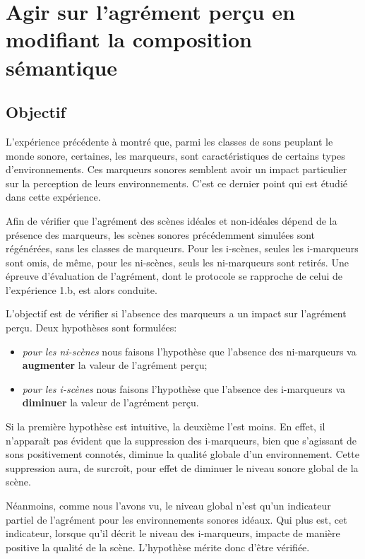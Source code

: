\section[Modification de la composition sémantique]{Agir sur l'agrément perçu en modifiant la composition sémantique}
\label{sec:xp3}

\subsection{Objectif}

L'expérience précédente à montré que, parmi les classes de sons peuplant le monde sonore, certaines, les marqueurs, sont caractéristiques de certains types d'environnements. Ces marqueurs sonores semblent avoir un impact particulier sur la perception de leurs environnements. C'est ce dernier point qui est étudié dans cette expérience.

Afin de vérifier que l'agrément des scènes idéales et non-idéales dépend de la présence des marqueurs, les scènes sonores précédemment simulées sont régénérées, sans les classes de marqueurs. Pour les i-scènes, seules les i-marqueurs sont omis, de même, pour les ni-scènes, seuls les ni-marqueurs sont retirés. Une épreuve d'évaluation de l'agrément, dont le protocole se rapproche de celui de l'expérience 1.b, est alors conduite.

L'objectif est de vérifier si l'absence des marqueurs a un impact sur l'agrément perçu. Deux hypothèses sont formulées:

\begin{itemize}
\item \emph{pour les ni-scènes} nous faisons l'hypothèse que l'absence des ni-marqueurs va \textbf{augmenter} la valeur de l'agrément perçu;
\item \emph{pour les i-scènes} nous faisons l'hypothèse que l'absence des i-marqueurs va \textbf{diminuer} la valeur de l'agrément perçu.
\end{itemize}

Si la première hypothèse est intuitive, la deuxième l'est moins. En effet, il n’apparaît pas évident que la suppression des i-marqueurs, bien que s'agissant de sons positivement connotés, diminue la qualité globale d'un environnement. Cette suppression aura, de surcroît, pour effet de diminuer le niveau sonore global de la scène. 

Néanmoins, comme nous l'avons vu, le niveau global n'est qu'un indicateur partiel de l'agrément pour les environnements sonores idéaux. Qui plus est, cet indicateur, lorsque qu'il décrit le niveau des i-marqueurs, impacte de manière positive la qualité de la scène. L'hypothèse mérite donc d'être vérifiée.

